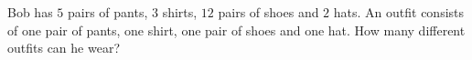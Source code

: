 Bob has $5$ pairs of pants, $3$ shirts, $12$ pairs of shoes and $2$ hats. An outfit consists of one pair of pants, one shirt, one pair of shoes and one hat. How many different outfits can he wear?
